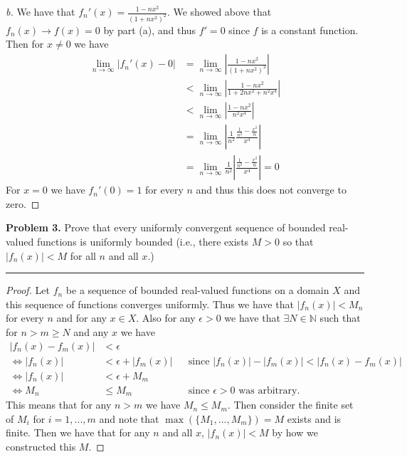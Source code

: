\documentclass[leqno]{article}
\theoremstyle{nonumberplain}
\newtheorem{proof}{Proof}
\begin{document}
\begin{proof}[b]
We have that $f_n'(x)=\frac{1-nx^2}{(1+nx^2)^2}$. We showed above that $f_n(x) \to f(x)=0$ by part (a), and thus $f'=0$ since $f$ is a constant function. Then for $x\neq 0$ we have
\begin{align*}
\lim_{n\to \infty} |f_n'(x)-0|&=\lim_{n\to \infty} \left| \frac{1-nx^2}{(1+nx^2)^2} \right|\\
&<\lim_{n\to \infty}\left| \frac{1-nx^2}{1+2nx^2+n^2x^4} \right|\\
&<\lim_{n\to \infty}\left| \frac{1-nx^2}{n^2x^4} \right|\\
&=\lim_{n\to \infty}\left| \frac{1}{n^2} \frac{\frac{1}{n^2} - \frac{x^2}{n}}{x^4} \right|\\
&=\lim_{n\to \infty} \frac{1}{n^2} \left| \frac{\frac{1}{n^2} -\frac{x^2}{n}}{x^4} \right|=0
\end{align*}
For $x=0$ we have $f_n'(0)=1$ for every $n$ and thus this does not converge to zero.
\end{proof}


\pagebreak




\noindent\textbf{Problem 3.} Prove that every uniformly convergent sequence of bounded real-valued functions is uniformly bounded (i.e., there exists $M>0$ so that $|f_n(x)|<M$ for all $n$ and all $x$.)

\noindent\rule[0.5ex]{\linewidth}{1pt}

\begin{proof}
Let $f_n$ be a sequence of bounded real-valued functions on a domain $X$ and this sequence of functions converges uniformly. Thus we have that $|f_n(x)|<M_n$ for every $n$ and for any $x\in X$. Also for any $\epsilon>0$ we have that $\exists N \in \mathbb{N}$ such that for $n>m\geq N$ and any $x$ we have
\begin{align*}
|f_n(x)-f_m(x)|&<\epsilon\\
\iff |f_n(x)|&<\epsilon + |f_m(x)| && \textrm{since $|f_n(x)|-|f_m(x)|<|f_n(x)-f_m(x)|$}\\
\iff |f_n(x)|&<\epsilon + M_m\\
\iff M_n &\leq M_m && \textrm{since $\epsilon>0$ was arbitrary}.
\end{align*}
This means that for any $n>m$ we have $M_n\leq M_m$.  Then consider the finite set of $M_i$ for $i=1,..., m$ and note that $\max(\{M_1,...,M_m\})=M$ exists and is finite.  Then we have that for any $n$ and all $x$, $|f_n(x)|<M$ by how we constructed this $M$.  
\end{proof}
\end{document}
